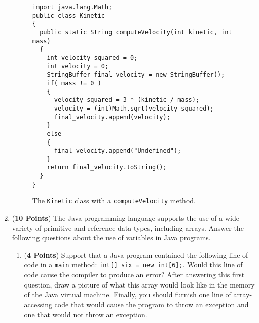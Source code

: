 \documentclass[12pt]{article}
\begin{document}
\begin{enumerate}
\begin{enumerate}








\end{enumerate}

\begin{figure}[p]

\begin{verbatim}
import java.lang.Math;
public class Kinetic
{
  public static String computeVelocity(int kinetic, int mass)
  {
    int velocity_squared = 0;
    int velocity = 0;
    StringBuffer final_velocity = new StringBuffer();
    if( mass != 0 )
    {
      velocity_squared = 3 * (kinetic / mass);
      velocity = (int)Math.sqrt(velocity_squared);
      final_velocity.append(velocity);
    }
    else
    {
      final_velocity.append("Undefined");
    }
    return final_velocity.toString();
  }
}
\end{verbatim}

\caption{The {\tt Kinetic} class with a {\tt computeVelocity} method.}
\label{Kinetic}

\end{figure}

\newpage

\item ({\bf 10 Points}) The Java programming language supports the use
  of a wide variety of primitive and reference data types, including
  arrays.  Answer the following questions about the use of variables
  in Java programs.

\begin{enumerate}

\item ({\bf 4 Points}) Support that a Java program contained the
  following line of code in a {\tt main} method: {\tt int[] six = new
    int[6];}.  Would this line of code cause the compiler to produce
  an error?  After answering this first question, draw a picture of
  what this array would look like in the memory of the Java virtual
  machine.  Finally, you should furnish one line of array-accessing
  code that would cause the program to throw an exception and one that
  would not throw an exception.


\end{enumerate}
\end{enumerate}
\end{document}
